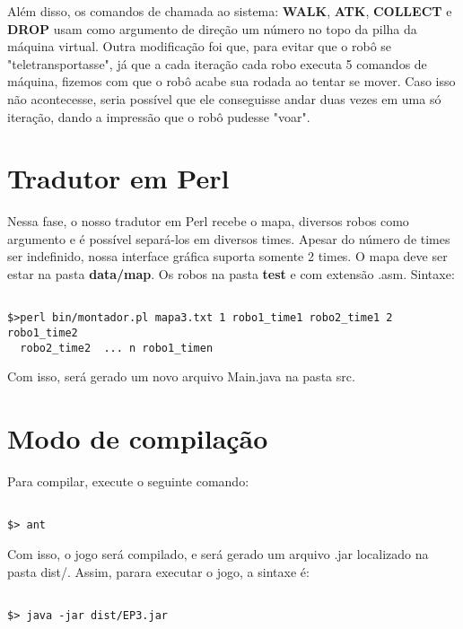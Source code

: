 \documentclass[11pt]{article}
\begin{document}
Além disso, os comandos de chamada ao sistema: \textbf{WALK}, \textbf{ATK}, \textbf{COLLECT} e \textbf{DROP} usam como argumento de direção um número no topo da pilha da máquina virtual.
Outra modificação foi que, para evitar que o robô se "teletransportasse", já que a cada iteração cada robo executa 5 comandos de máquina, fizemos com que o robô acabe sua
rodada ao tentar se mover. Caso isso não acontecesse, seria possível que ele conseguisse andar duas vezes em uma só iteração, dando a impressão que o robô pudesse "voar".






\section{Tradutor em Perl}

Nessa fase, o nosso tradutor em Perl recebe o mapa, diversos robos como argumento e é possível separá-los em diversos times. Apesar do número de times ser indefinido,
nossa interface gráfica suporta somente 2 times. O mapa deve ser estar na pasta \textbf{\color{red}data/map}. Os robos na pasta \textbf{\color{red}test} e com extensão .asm.
Sintaxe:

\begin{verbatim}

$>perl bin/montador.pl mapa3.txt 1 robo1_time1 robo2_time1 2 robo1_time2
  robo2_time2  ... n robo1_timen

\end{verbatim}
Com isso, será gerado um novo arquivo Main.java na pasta src.

\section{Modo de compilação}

Para compilar, execute o seguinte comando:

\begin{verbatim}

$> ant

\end{verbatim}

Com isso, o jogo será compilado, e será gerado um arquivo .jar localizado na pasta dist/. Assim, parara executar o jogo, a sintaxe é:

\begin{verbatim}

$> java -jar dist/EP3.jar

\end{verbatim}
\end{document}
